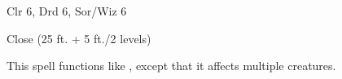 
\begin{description*}
\item[Level:] Clr 6, Drd 6, Sor/Wiz 6
\item[Range:] Close (25 ft. + 5 ft./2 levels)
\end{description*}

This spell functions like , except that it affects multiple
creatures.